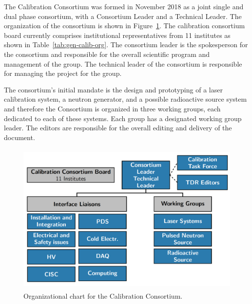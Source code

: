 
The Calibration Consortium was formed in November 2018 as a joint single and dual phase consortium, with a Consortium Leader and a Technical Leader. The organization of the consortium is shown in Figure~\ref{fig:orgchart}. The calibration consortium board currently comprises institutional representatives from 11 institutes as shown in Table~\ref{tab:gen-calib-org}. The consortium leader is the spokesperson for the consortium and responsible for the overall scientific program and management of the group. The technical leader of the consortium is responsible for managing the project for the group. 

The consortium's initial mandate is the design and prototyping of a laser calibration system, a neutron generator, and a possible radioactive source system and therefore the Consortium is organized in three working groups, each dedicated to each of these systems. Each group has a designated working group leader.
The  editors are responsible for the overall editing and delivery of the  document.

\begin{figure}[tbp]
\centering
\includegraphics[height=3.0in]{graphics/orgchart.png}
\caption{Organizational chart for the Calibration Consortium.}
\label{fig:orgchart}
\end{figure}

